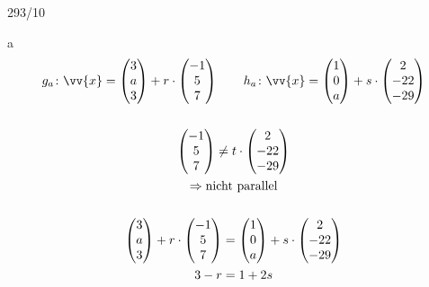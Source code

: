 \begin{exercise}{293/10}
  \item [a]
  \begin{gather*}
    g_a \colon \vv{x} = \begin{pmatrix}3 \\ a \\ 3\end{pmatrix} + r \cdot \begin{pmatrix}-1 \\ 5 \\ 7\end{pmatrix} \qquad h_a \colon \vv{x} = \begin{pmatrix}1 \\ 0 \\ a\end{pmatrix} + s \cdot \begin{pmatrix}2 \\ -22 \\ -29\end{pmatrix} \\\\
    \begin{pmatrix}-1 \\ 5 \\ 7\end{pmatrix} \neq t \cdot \begin{pmatrix}2 \\ -22 \\ -29\end{pmatrix} \\
    \Rightarrow \text{nicht parallel} \\\\
    \begin{pmatrix}3 \\ a \\ 3\end{pmatrix} + r \cdot \begin{pmatrix}-1 \\ 5 \\ 7\end{pmatrix} = \begin{pmatrix}1 \\ 0 \\ a\end{pmatrix} + s \cdot \begin{pmatrix}2 \\ -22 \\ -29\end{pmatrix} \\
    3 - r = 1 + 2s \\

\end{gather*}
\end{exercise}
